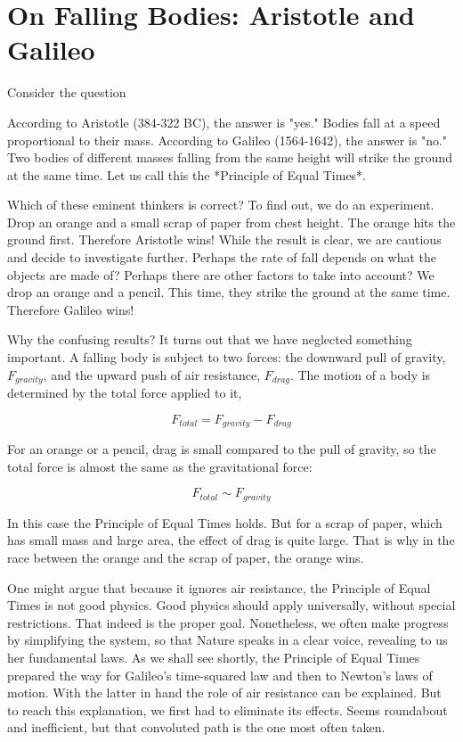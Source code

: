 \section{On Falling Bodies: Aristotle and Galileo}

Consider the question

\begin{indent}
\end{indent}

According to Aristotle (384-322 BC), the answer is "yes." Bodies fall at a speed proportional to their mass. According to Galileo (1564-1642), the answer is "no." Two bodies of different masses falling from the same height will strike the ground at the same time.  Let us call this the *Principle of Equal Times*.

Which of these eminent thinkers is correct?  To find out, we do an experiment. Drop an orange and a small scrap of paper from chest height. The orange hits the ground first.  Therefore Aristotle wins!  While the result is clear, we are cautious and decide to investigate further.  Perhaps the rate of fall depends on what the objects are made of? Perhaps there are other factors to take into account? We drop an orange and a pencil. This time, they strike the ground at the same time. Therefore Galileo wins!

Why the confusing results?  It turns out  that we have neglected something important.  A falling body is subject to two forces: the downward pull of gravity, $F_{gravity}$, and the upward push of air resistance, $F_{drag}$. The motion of a body is determined by the total force applied to it,

$$
F_{total} = F_{gravity} - F_{drag}
$$

For an orange or a pencil, drag is small compared to the pull of gravity, so the total force  is almost the same as the gravitational force:

$$
F_{total} \sim F_{gravity}
$$

In this case the Principle of Equal Times holds.  But for a scrap of paper, which has small mass and large area, the effect of drag is quite large.  That is why in the race between the orange and the scrap of paper, the orange wins.


One might argue that because it ignores air resistance, the Principle of Equal Times is not good physics.  Good physics should apply universally, without special restrictions.  That indeed is the proper goal.  Nonetheless, we often make progress by simplifying the system, so that Nature speaks in a clear voice, revealing to us her fundamental laws.  As we shall see shortly, the Principle of Equal Times prepared the way for Galileo's time-squared law and then to Newton's laws of motion.  With the latter in hand the role of air resistance can be explained.  But to reach this explanation, we first had to eliminate its effects.  Seems roundabout and inefficient, but that convoluted path is the one most often taken.





